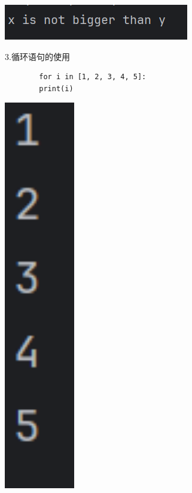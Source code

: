 \documentclass{article}
\begin{document}
	
	\noindent
	\begin{minipage}{\linewidth}
		\centering
		\includegraphics[width=0.5\linewidth]{example2.png}
		\label{fig:example}
	\end{minipage}
	
	3.循环语句的使用
	\begin{verbatim}
		for i in [1, 2, 3, 4, 5]:
		print(i)
	\end{verbatim}
	
	\noindent
	\begin{minipage}{\linewidth}
		\centering
		\includegraphics[width=0.5\linewidth,height=17cm]{example3.png}
		\label{fig:example}
	\end{minipage}
	
\end{document}
